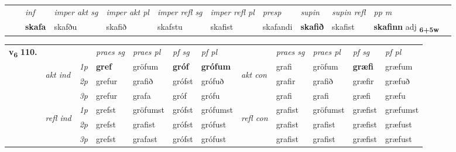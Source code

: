 \begin{tabular}{llllllllllll}
 & & \textit{inf} & \textit{imper akt sg} & \textit{imper akt pl} & \textit{imper refl sg} & \textit{imper refl pl} & \textit{presp} & \textit{supin} & \textit{supin refl} & \textit{pp m}     \\*
  & & \textbf{skafa} & skafðu  & skafið & skafstu & skafist & skafandi &  \textbf{skafið} & skafist & \textbf{skafinn} adj \textbf{\textsubscript{6+5w}} \\*
\cmidrule{1-12}
\end{tabular}



\begin{tabular}{llllllllllll} \toprule
\multirow{4}{*}{{{\textbf{v{\textsubscript{6}}} \Large{\textbf{110.}}}}}  & &   &  \textit{praes sg}  & \textit{praes pl}  &\textit{ pf sg} & \textit{pf pl} &  &  \textit{praes sg}  & \textit{praes pl}  & \textit{pf sg} & \textit{pf pl } \\*
	\cmidrule{4-7} \cmidrule{9-12}
 & \multirow{3}{*}{\begin{turn}{90}\textit{akt ind}\end{turn}} & {\textit{1p}} & \textbf{gref} & gröfum    & \textbf{gróf} & \textbf{grófum} & \multirow{3}{*}{\begin{turn}{90}\textit{akt con}\end{turn}} &grafi & gröfum & \textbf{græfi} & græfum\\*
& &  {\textit{2p}} &  grefur  & grafið   & grófst & grófuð & & grafir & grafið & græfir & græfuð \\*
& &  {\textit{3p}} & grefur & grafa   & gróf & grófu & & grafi & grafi& græfi & græfu  \\*
\cmidrule{4-7} \cmidrule{9-12}
 &\multirow{3}{*}{\begin{turn}{90}\textit{refl ind}\end{turn}} & {\textit{1p}} & grefst & gröfumst    & grófst & grófumst & \multirow{3}{*}{\begin{turn}{90}\textit{refl con}\end{turn}}  &grafist & gröfumst & græfist & græfumst\\*
 &&  {\textit{2p}} &  grefst  & grafist   & grófst & grófust & &grafist & grafist & græfist & græfust \\*
& &  {\textit{3p}} & grefst & grafast   & grófst & grófust & & grafist & grafist& græfist & græfust  \\*
\cmidrule{4-7} \cmidrule{9-12}
\end{tabular}


